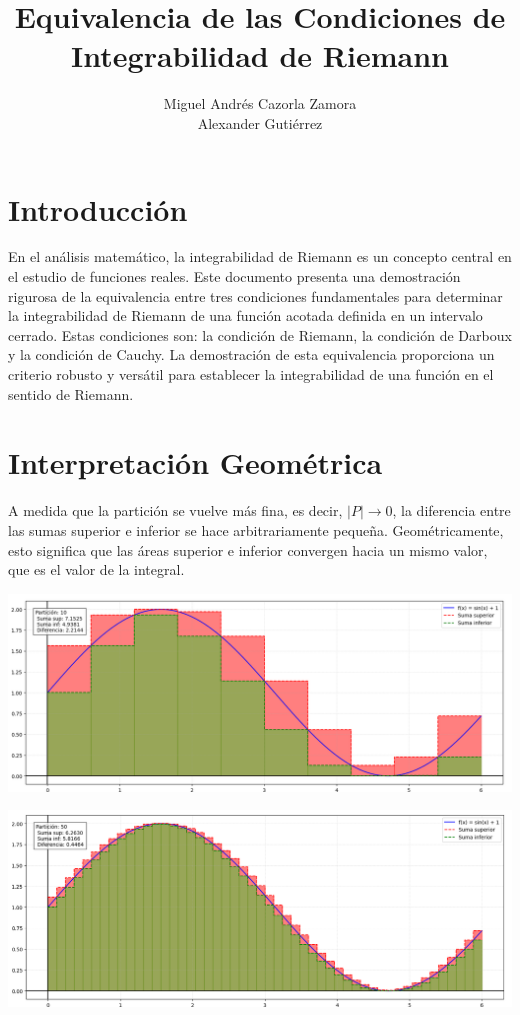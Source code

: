 \documentclass{article}
\title{Equivalencia de las Condiciones de Integrabilidad de Riemann}
\author{Miguel Andrés Cazorla Zamora \\ Alexander Gutiérrez}
\date{}
\begin{document}
    \maketitle
	\section{Introducción}
	En el análisis matemático, la integrabilidad de Riemann es un concepto central en el estudio de funciones reales. Este documento presenta una demostración rigurosa de la equivalencia entre tres condiciones fundamentales para determinar la integrabilidad de Riemann de una función acotada definida en un intervalo cerrado. Estas condiciones son: la condición de Riemann, la condición de Darboux y la condición de Cauchy. La demostración de esta equivalencia proporciona un criterio robusto y versátil para establecer la integrabilidad de una función en el sentido de Riemann.
	\section{Interpretación Geométrica}
    A medida que la partición se vuelve más fina, es decir, $|P| \to 0$, la diferencia entre las sumas superior e inferior se hace arbitrariamente pequeña. Geométricamente, esto significa que las áreas superior e inferior convergen hacia un mismo valor, que es el valor de la integral.

\begin{center}
    \includegraphics[width=1\textwidth]{Figure_1.png}
\end{center}
    
\begin{center}
    \includegraphics[width=1\textwidth]{Figure_2.png}
\end{center}
\end{document}

